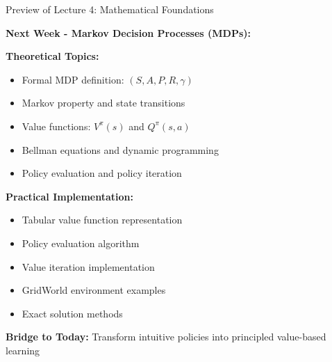 \documentclass[aspectratio=169,10pt]{beamer}
\begin{document}
\begin{frame}{Preview of Lecture 4: Mathematical Foundations}

\textbf{Next Week - Markov Decision Processes (MDPs):}

\vfill

\textbf{Theoretical Topics:}
\begin{itemize}
    \item Formal MDP definition: $(S, A, P, R, \gamma)$
    \item Markov property and state transitions
    \item Value functions: $V^{\pi}(s)$ and $Q^{\pi}(s,a)$
    \item Bellman equations and dynamic programming
    \item Policy evaluation and policy iteration
\end{itemize}

\vfill

\textbf{Practical Implementation:}
\begin{itemize}
    \item Tabular value function representation
    \item Policy evaluation algorithm
    \item Value iteration implementation
    \item GridWorld environment examples
    \item Exact solution methods
\end{itemize}

\vfill

\textbf{Bridge to Today:} Transform intuitive policies into principled value-based learning

\end{frame}
\end{document}
